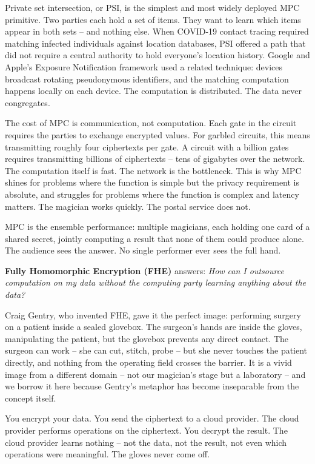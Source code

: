 \documentclass[
  11pt,
  openany]{report}
\renewcommand{\textbf}[1]{{\bfseries\color{MidnightBold}#1}}
\begin{document}
Private set intersection, or PSI, is the simplest and most widely deployed MPC
primitive. Two parties each hold a set of items. They want to learn which items
appear in both sets -- and nothing else. When COVID-19 contact tracing required
matching infected individuals against location databases, PSI offered a path
that did not require a central authority to hold everyone's location history.
Google and Apple's Exposure Notification framework used a related technique:
devices broadcast rotating pseudonymous identifiers, and the matching
computation happens locally on each device. The computation is distributed. The
data never congregates.

The cost of MPC is communication, not computation. Each gate in the circuit
requires the parties to exchange encrypted values. For garbled circuits, this
means transmitting roughly four ciphertexts per gate. A circuit with a billion
gates requires transmitting billions of ciphertexts -- tens of gigabytes over
the network. The computation itself is fast. The network is the bottleneck. This
is why MPC shines for problems where the function is simple but the privacy
requirement is absolute, and struggles for problems where the function is
complex and latency matters. The magician works quickly. The postal service does
not.

MPC is the ensemble performance: multiple magicians, each holding one card of a
shared secret, jointly computing a result that none of them could produce alone.
The audience sees the answer. No single performer ever sees the full hand.

\textbf{Fully Homomorphic Encryption (FHE)} answers: \emph{How can I outsource
computation on my data without the computing party learning anything about the
data?}

Craig Gentry, who invented FHE, gave it the perfect image: performing surgery on
a patient inside a sealed glovebox. The surgeon's hands are inside the gloves,
manipulating the patient, but the glovebox prevents any direct contact. The
surgeon can work -- she can cut, stitch, probe -- but she never touches the
patient directly, and nothing from the operating field crosses the barrier. It
is a vivid image from a different domain -- not our magician's stage but a
laboratory -- and we borrow it here because Gentry's metaphor has become
inseparable from the concept itself.

You encrypt your data. You send the ciphertext to a cloud provider. The cloud
provider performs operations on the ciphertext. You decrypt the result. The
cloud provider learns nothing -- not the data, not the result, not even which
operations were meaningful. The gloves never come off.
\end{document}
